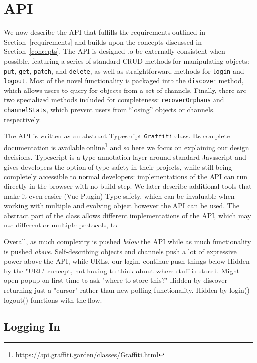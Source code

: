 \section{API}

We now describe the API that fulfills the requirements
outlined in Section~\ref{requirements} and builds upon the concepts
discussed in Section~\ref{concepts}.
The API is designed to be externally consistent when possible,
featuring a series of standard CRUD methods for manipulating objects:
\texttt{put}, \texttt{get}, \texttt{patch}, and \texttt{delete},
as well as straightforward methods for \texttt{login} and \texttt{logout}.
Most of the novel functionality is packaged into the \texttt{discover} method, which allows
users to query for objects from a set of channels.
Finally, there are two specialized methods included for completeness:
\texttt{recoverOrphans} and \texttt{channelStats},
which prevent users from ``losing'' objects or channels, respectively.

The API is written as an abstract Typescript \texttt{Graffiti} class.
Its complete documentation is available online\footnote{
    \url{https://api.graffiti.garden/classes/Graffiti.html}
} and so here we focus on explaining our design decisions.
Typescript is a type annotation layer around standard Javascript
and gives developers the option of type safety in their projects,
while still being completely accessible to normal developers:
implementations of the API can run directly in the browser with
no build step.
We later describe additional tools that make it even easier (Vue Plugin)
Type safety, which can be invaluable when working with multiple and
evolving object
however the API can be used.
The abstract part of the class allows different implementations of
the API, which may use different or multiple protocols,
to

Overall, as much complexity is pushed \emph{below} the API
while as much functionality is pushed \emph{above}.
Self-describing objects and channels push a lot of expressive
power above the API, while URLs, our login, continue push
things below
Hidden by the "URL" concept, not having to think about where stuff is stored.
Might open popup on first time to ask "where to store this?"
Hidden by discover returning just a "cursor" rather than new polling functionality.
Hidden by login() logout() functions with the flow.

\subsection{Logging In}

